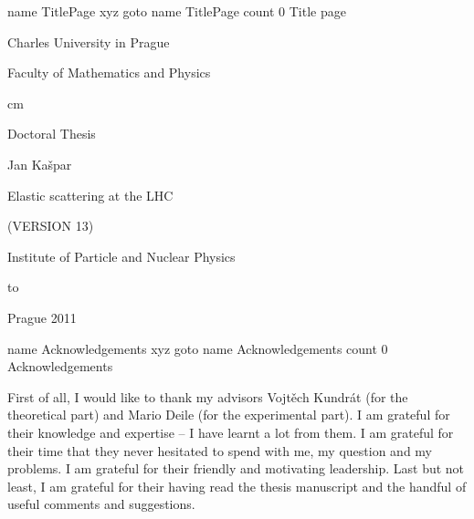 







\let\BiggerFonts\SetFontSizesXII
\let\NormalFonts\SetFontSizesX
\let\SmallerFonts\SetFontSizesVIII

\NormalFonts

\ParIndent=5mm

\Reftrue
\Toctrue

\iffalse
	\ShowLabelstrue \advance\hoffset-1.5cm
\else
	\def\FootText{(VERSION 13)}
\fi

\def\pmt#1{{\tt #1}}



\pdfdest name {TitlePage} xyz
\pdfoutline goto name {TitlePage} count 0 {Title page}%


\centerline{\fPbxiv Charles University in Prague}
\centerline{\fPbxiv Faculty of Mathematics and Physics}
	cm
\centerline{\fPbxx Doctoral Thesis}
\vskip1cm
\centerline{}
\vskip3cm
\centerline{\fPbxiv Jan Ka\v spar}
\vskip1cm
\centerline{\fPbxx Elastic scattering at the LHC}
\centerline{\fPbxx\FootText}
\vskip2cm
\centerline{\fPbxiv Institute of Particle and Nuclear Physics}
\ialign to
\vskip2cm
\centerline{\fPbxiv Prague 2011}

\vfil\eject
\forceoddpage


\pdfdest name {Acknowledgements} xyz
\pdfoutline goto name {Acknowledgements} count 0 {Acknowledgements}%

\bgroup


\vfil

First of all, I would like to thank my advisors Vojtěch Kundrát (for the theoretical part) and Mario Deile (for the experimental part). I am grateful for their knowledge and expertise -- I have learnt a lot from them. I am grateful for their time that they never hesitated to spend with me, my question and my problems. I am grateful for their friendly and motivating leadership. Last but not least, I am grateful for their having read the thesis manuscript and the handful of useful comments and suggestions.

